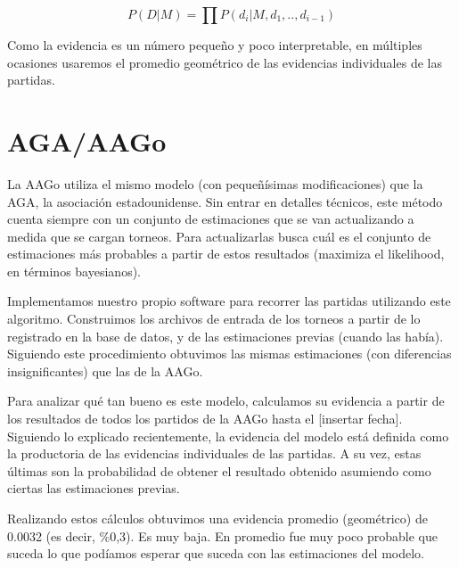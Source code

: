 \documentclass[a4paper,10pt]{report}
\begin{document}
\begin{equation}\label{eq:productoria-evidencia}
	P(D|M) = \prod P(d_i|M, d_{1}, .., d_{i-1})
\end{equation}

Como la evidencia es un número pequeño y poco interpretable, en múltiples ocasiones usaremos el promedio geométrico de las evidencias individuales de las partidas.

\section*{AGA/AAGo}

La AAGo utiliza el mismo modelo (con pequeñísimas modificaciones) que la AGA, la asociación estadounidense.
Sin entrar en detalles técnicos, este método cuenta siempre con un conjunto de estimaciones que se van actualizando a medida que se cargan torneos.
Para actualizarlas busca cuál es el conjunto de estimaciones más probables a partir de estos resultados (maximiza el likelihood, en términos bayesianos).


Implementamos nuestro propio software para recorrer las partidas utilizando este algoritmo.
Construimos los archivos de entrada de los torneos a partir de lo registrado en la base de datos, y de las estimaciones previas (cuando las había).
Siguiendo este procedimiento obtuvimos las mismas estimaciones (con diferencias insignificantes) que las de la AAGo.

Para analizar qué tan bueno es este modelo, calculamos su evidencia a partir de los resultados de todos los partidos de la AAGo hasta el [insertar fecha].
Siguiendo lo explicado recientemente, la evidencia del modelo está definida como la productoria de las evidencias individuales de las partidas.
A su vez, estas últimas son la probabilidad de obtener el resultado obtenido asumiendo como ciertas las estimaciones previas. %

Realizando estos cálculos obtuvimos una evidencia promedio (geométrico) de 0.0032 (es decir, \%0,3).
Es muy baja.
En promedio fue muy poco probable que suceda lo que podíamos esperar que suceda con las estimaciones del modelo.
\end{document}

